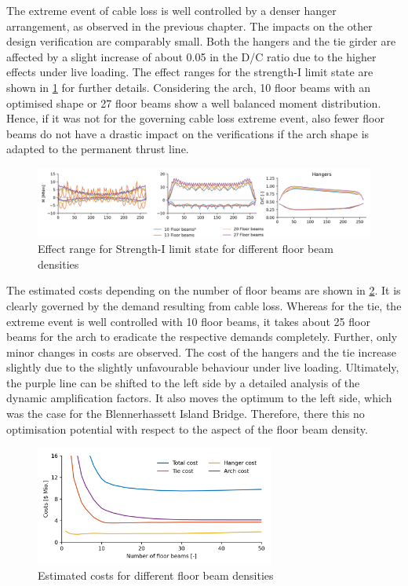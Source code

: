 The extreme event of cable loss is well controlled by a denser hanger arrangement, as observed in the previous chapter. The impacts on the other design verification are comparably small. Both the hangers and the tie girder are affected by a slight increase of about 0.05 in the D/C ratio due to the higher effects under live loading. The effect ranges for the strength-I limit state are shown in \cref{fig:fb_strength} for further details. Considering the arch, 10 floor beams with an optimised shape or 27 floor beams show a well balanced moment distribution. Hence, if it was not for the governing cable loss extreme event, also fewer floor beams do not have a drastic impact on the verifications if the arch shape is adapted to the permanent thrust line.

\begin{figure}[H]
    \centering
    \includegraphics[trim={0 0 1cm 0},clip, width=\textwidth]{calculations/floor beam density/strength-I_plot.png}
    \caption{Effect range for Strength-I limit state for different floor beam densities}
    \label{fig:fb_strength}
\end{figure}


The estimated costs depending on the number of floor beams are shown in \cref{fig:fb_costs}. It is clearly governed by the demand resulting from cable loss. Whereas for the tie, the extreme event is well controlled with 10 floor beams, it takes about 25 floor beams for the arch to eradicate the respective demands completely. Further, only minor changes in costs are observed. The cost of the hangers and the tie increase slightly due to the slightly unfavourable behaviour under live loading. Ultimately, the purple line can be shifted to the left side by a detailed analysis of the dynamic amplification factors. It also moves the optimum to the left side, which was the case for the Blennerhassett Island Bridge. Therefore, there this no optimisation potential with respect to the aspect of the floor beam density.

\begin{figure}[H]
    \centering
    \includegraphics[width=0.7\textwidth]{calculations/floor beam density/cost comparison.png}
    \caption{Estimated costs for different floor beam densities}
    \label{fig:fb_costs}
\end{figure}


